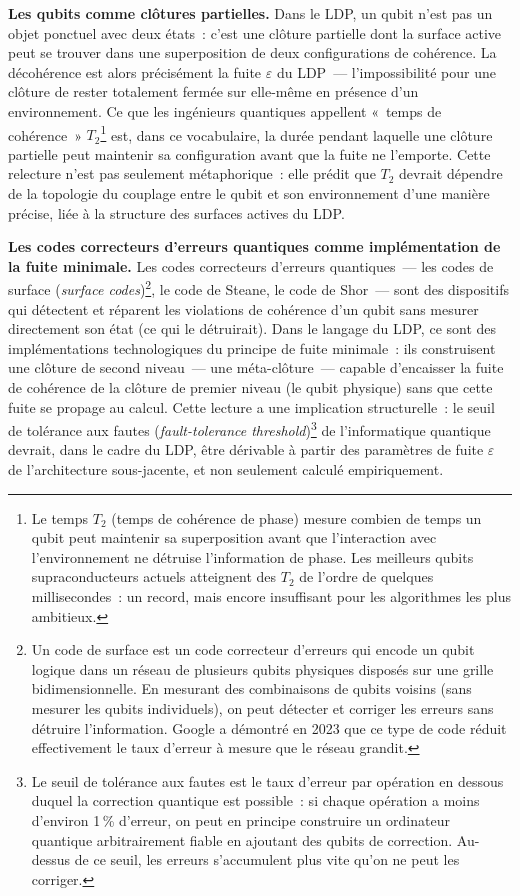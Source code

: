 \documentclass[12pt, a4paper, openright]{book}
\begin{document}
\medskip

\textbf{Les qubits comme clôtures partielles.} Dans le LDP, un qubit n'est pas un objet ponctuel avec deux états~: c'est une clôture partielle dont la surface active peut se trouver dans une superposition de deux configurations de cohérence. La décohérence est alors précisément la fuite $\varepsilon$ du LDP~--- l'impossibilité pour une clôture de rester totalement fermée sur elle-même en présence d'un environnement. Ce que les ingénieurs quantiques appellent «~temps de cohérence~» $T_2$\footnote{Le temps $T_2$ (temps de cohérence de phase) mesure combien de temps un qubit peut maintenir sa superposition avant que l'interaction avec l'environnement ne détruise l'information de phase. Les meilleurs qubits supraconducteurs actuels atteignent des $T_2$ de l'ordre de quelques millisecondes~: un record, mais encore insuffisant pour les algorithmes les plus ambitieux.} est, dans ce vocabulaire, la durée pendant laquelle une clôture partielle peut maintenir sa configuration avant que la fuite ne l'emporte. Cette relecture n'est pas seulement métaphorique~: elle prédit que $T_2$ devrait dépendre de la topologie du couplage entre le qubit et son environnement d'une manière précise, liée à la structure des surfaces actives du LDP.

\medskip

\textbf{Les codes correcteurs d'erreurs quantiques comme implémentation de la fuite minimale.} Les codes correcteurs d'erreurs quantiques~--- les codes de surface (\emph{surface codes})\footnote{Un code de surface est un code correcteur d'erreurs qui encode un qubit logique dans un réseau de plusieurs qubits physiques disposés sur une grille bidimensionnelle. En mesurant des combinaisons de qubits voisins (sans mesurer les qubits individuels), on peut détecter et corriger les erreurs sans détruire l'information. Google a démontré en 2023 que ce type de code réduit effectivement le taux d'erreur à mesure que le réseau grandit.}, le code de Steane, le code de Shor~--- sont des dispositifs qui détectent et réparent les violations de cohérence d'un qubit sans mesurer directement son état (ce qui le détruirait). Dans le langage du LDP, ce sont des implémentations technologiques du principe de fuite minimale~: ils construisent une clôture de second niveau~--- une méta-clôture~--- capable d'encaisser la fuite de cohérence de la clôture de premier niveau (le qubit physique) sans que cette fuite se propage au calcul. Cette lecture a une implication structurelle~: le seuil de tolérance aux fautes (\emph{fault-tolerance threshold})\footnote{Le seuil de tolérance aux fautes est le taux d'erreur par opération en dessous duquel la correction quantique est possible~: si chaque opération a moins d'environ 1\,\% d'erreur, on peut en principe construire un ordinateur quantique arbitrairement fiable en ajoutant des qubits de correction. Au-dessus de ce seuil, les erreurs s'accumulent plus vite qu'on ne peut les corriger.} de l'informatique quantique devrait, dans le cadre du LDP, être dérivable à partir des paramètres de fuite $\varepsilon$ de l'architecture sous-jacente, et non seulement calculé empiriquement.
\end{document}
